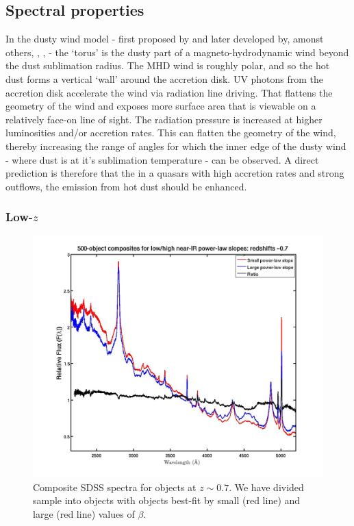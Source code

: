 \subsection{Spectral properties}

In the dusty wind model - first proposed by \citet{konigl94} and later developed by, amonst others, \citet{everett05}, \citet{elitzur06}, \citet{keating12} - the `torus' is the dusty part of a magneto-hydrodynamic wind beyond the dust sublimation radius. 
The MHD wind is roughly polar, and so the hot dust forms a vertical `wall' around the accretion disk.  
UV photons from the accretion disk accelerate the wind via radiation line driving. 
That flattens the geometry of the wind and exposes more surface area that is viewable on a relatively face-on line of sight.  
The radiation pressure is increased at higher luminosities and/or accretion rates.
This can flatten the geometry of the wind, thereby increasing the range of angles for which the inner edge of the dusty wind - where dust is at it's sublimation temperature - can be observed. 
A direct prediction is therefore that the in a quasars with high accretion rates and strong outflows, the emission from hot dust should be enhanced. 

\subsubsection{Low-$z$}

\begin{figure}
  \centering
  \includegraphics[width=\textwidth]{figures/chapter05/z07_pls_comps.jpg}
  \caption{Composite SDSS spectra for objects at $z\sim0.7$. We have divided sample into objects with objects best-fit by small (red line) and large (red line) values of $\beta$. }
  \label{fig:pls_comp}
\end{figure}

